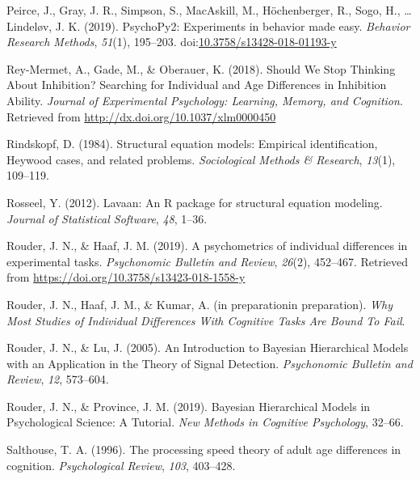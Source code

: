 \documentclass[
  ,man,floatsintext]{apa6}
\newlength{\cslhangindent}
\newlength{\cslentryspacingunit} %
\newenvironment{CSLReferences}[2] %
 {%
  \setlength{\parindent}{0pt}
  \ifodd #1
  \let\oldpar\par
  \def\par{\hangindent=\cslhangindent\oldpar}
  \fi
  \setlength{\parskip}{#2\cslentryspacingunit}
 }%
 {}
\begin{document}
\begin{CSLReferences}{1}{0}
\leavevmode{}%
Peirce, J., Gray, J. R., Simpson, S., MacAskill, M., Höchenberger, R., Sogo, H., \ldots{} Lindeløv, J. K. (2019). {PsychoPy2}: {Experiments} in behavior made easy. \emph{Behavior Research Methods}, \emph{51}(1), 195--203. doi:\href{https://doi.org/10.3758/s13428-018-01193-y}{10.3758/s13428-018-01193-y}

\leavevmode{}%
Rey-Mermet, A., Gade, M., \& Oberauer, K. (2018). Should {We Stop Thinking About Inhibition}? {Searching} for {Individual} and {Age Differences} in {Inhibition Ability}. \emph{Journal of Experimental Psychology: Learning, Memory, and Cognition}. Retrieved from \url{http://dx.doi.org/10.1037/xlm0000450}

\leavevmode{}%
Rindskopf, D. (1984). Structural equation models: {Empirical} identification, {Heywood} cases, and related problems. \emph{Sociological Methods \& Research}, \emph{13}(1), 109--119.

\leavevmode{}%
Rosseel, Y. (2012). Lavaan: {An R} package for structural equation modeling. \emph{Journal of Statistical Software}, \emph{48}, 1--36.

\leavevmode{}%
Rouder, J. N., \& Haaf, J. M. (2019). A psychometrics of individual differences in experimental tasks. \emph{Psychonomic Bulletin and Review}, \emph{26}(2), 452--467. Retrieved from \url{https://doi.org/10.3758/s13423-018-1558-y}

\leavevmode{}%
Rouder, J. N., Haaf, J. M., \& Kumar, A. (in preparationin preparation). \emph{Why {Most Studies} of {Individual Differences With Cognitive Tasks Are Bound To Fail}}.

\leavevmode{}%
Rouder, J. N., \& Lu, J. (2005). An {Introduction} to {Bayesian Hierarchical Models} with an {Application} in the {Theory} of {Signal Detection}. \emph{Psychonomic Bulletin and Review}, \emph{12}, 573--604.

\leavevmode{}%
Rouder, J. N., \& Province, J. M. (2019). Bayesian {Hierarchical Models} in {Psychological Science}: {A Tutorial}. \emph{New Methods in Cognitive Psychology}, 32--66.

\leavevmode{}%
Salthouse, T. A. (1996). The processing speed theory of adult age differences in cognition. \emph{Psychological Review}, \emph{103}, 403--428.


\end{CSLReferences}
\end{document}

